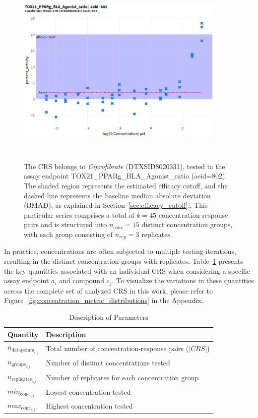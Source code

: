 \begin{figure}
    \centering
    \includegraphics[width=0.9\textwidth]{figures/CRS.png}  
    \caption{The CRS belongs to \emph{Ciprofibrate} (DTXSID8020331), tested in the assay endpoint TOX21\_PPARg\_BLA\_Agonist\_ratio (aeid=802). The shaded region represents the estimated efficacy cutoff, and the dashed line represents the baseline median absolute deviation (BMAD), as explained in Section~\ref{sec:efficacy_cutoff}.. This particular series comprises a total of $k = 45$ concentration-response pairs and is structured into $n_{conc} = 15$ distinct concentration groups, with each group consisting of $n_{rep} = 3$ replicates. }
~\label{fig:concentration_response_series} 
\end{figure}

In practice, concentrations are often subjected to multiple testing iterations, resulting in the distinct concentration groups with replicates. Table~\ref{tab:concentrations_quantities} presents the key quantities associated with an individual CRS when considering a specific assay endpoint $a_i$ and compound $c_j$. To visualize the variations in these quantities across the complete set of analyzed CRS in this work, please refer to Figure~\ref{fig:concentration_metric_distributions} in the Appendix. 

\begin{table}
    \centering
    \caption{Description of Parameters}
    \label{tab:concentrations_quantities}
    \begin{tabular}{ll}
        \toprule
        \textbf{Quantity} & \textbf{Description} \\
        \midrule
        $n_{\text{datapoints}_{i,j}}$ & Total number of concentration-response pairs ($|CRS|$) \\
        $n_{\text{groups}_{i,j}}$ & Number of distinct concentrations tested \\
        $n_{\text{replicates}_{i,j}}$ & Number of replicates for each concentration group \\
        $min_{\text{conc}_{i,j}}$ & Lowest concentration tested \\
        $max_{\text{conc}_{i,j}}$ & Highest concentration tested \\
        \bottomrule
    \end{tabular}
\end{table}

